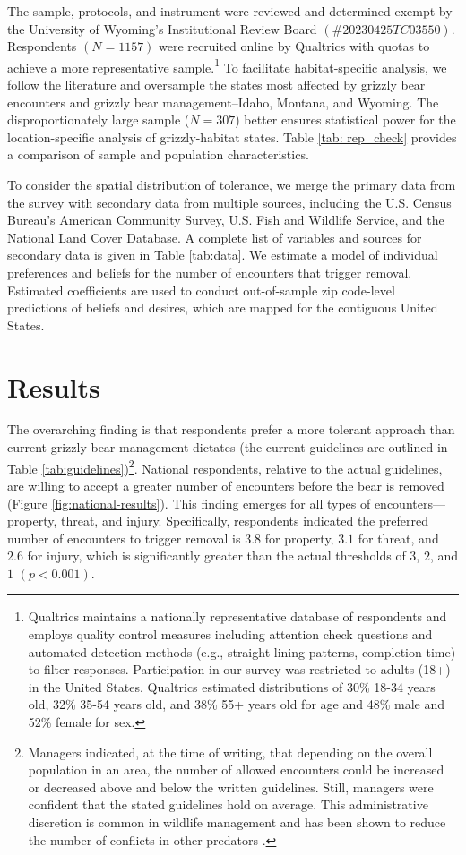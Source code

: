\documentclass[english,12pt]{article}
\begin{document}
The sample, protocols, and instrument were reviewed and determined exempt by the University of Wyoming's Institutional Review Board $(\#20230425TC03550)$. Respondents $(N=1157)$ were recruited online by Qualtrics with quotas to achieve a more representative sample.\footnote{Qualtrics maintains a nationally representative database of respondents and employs quality control measures including attention check questions and automated detection methods (e.g., straight-lining patterns, completion time) to filter responses. Participation in our survey was restricted to adults (18+) in the United States. Qualtrics estimated distributions of 30\% 18-34 years old, 32\% 35-54 years old, and 38\% 55+ years old for age and 48\% male and 52\% female for sex.} To facilitate habitat-specific analysis, we follow the literature \citep[e.g.][]{kalton2009methods} and oversample the states most affected by grizzly bear encounters and grizzly bear management--Idaho, Montana, and Wyoming. The disproportionately large sample ($N=307$) better ensures statistical power for the location-specific analysis of grizzly-habitat states. Table \ref{tab: rep_check} provides a comparison of sample and population characteristics.

To consider the spatial distribution of tolerance, we merge the primary data from the survey with secondary data from multiple sources, including the U.S. Census Bureau’s American Community Survey, U.S. Fish and Wildlife Service, and the National Land Cover Database. A complete list of variables and sources for secondary data is given in Table \ref{tab:data}. We estimate a model of individual preferences and beliefs for the number of encounters that trigger removal. Estimated coefficients are used to conduct out-of-sample zip code-level predictions of beliefs and desires, which are mapped for the contiguous United States.


\section{Results}
\label{sec: results}
The overarching finding is that respondents prefer a more tolerant approach than current grizzly bear management dictates (the current guidelines are outlined in Table \ref{tab:guidelines})\footnote{Managers indicated, at the time of writing, that depending on the overall population in an area, the number of allowed encounters could be increased or decreased above and below the written guidelines. Still, managers were confident that the stated guidelines hold on average. This administrative discretion is common in wildlife management and has been shown to reduce the number of conflicts in other predators \citep{stier2016ecosystem, young2019interactions}.}. National respondents, relative to the actual guidelines, are willing to accept a greater number of encounters before the bear is removed (Figure \ref{fig:national-results}). This finding emerges for all types of encounters---property, threat, and injury. Specifically, respondents indicated the preferred number of encounters to trigger removal is $3.8$ for property, $3.1$ for threat, and $2.6$ for injury, which is significantly greater than the actual thresholds of $3$, $2$, and $1$ $(p < 0.001)$.
\end{document}
